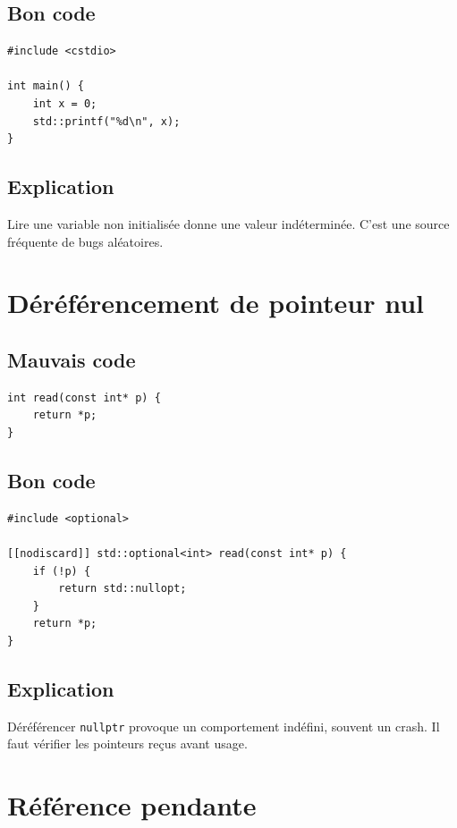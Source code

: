 \documentclass[a4paper,11pt]{report}
\begin{document}
\section{Bon code}
\begin{lstlisting}
#include <cstdio>

int main() {
    int x = 0;
    std::printf("%d\n", x);
}
\end{lstlisting}

\section{Explication}
Lire une variable non initialisée donne une valeur indéterminée.
C'est une source fréquente de bugs aléatoires.

\chapter{Déréférencement de pointeur nul}

\section{Mauvais code}
\begin{lstlisting}
int read(const int* p) {
    return *p;
}
\end{lstlisting}

\section{Bon code}
\begin{lstlisting}
#include <optional>

[[nodiscard]] std::optional<int> read(const int* p) {
    if (!p) {
        return std::nullopt;
    }
    return *p;
}
\end{lstlisting}

\section{Explication}
Déréférencer \texttt{nullptr} provoque un comportement indéfini, souvent un crash.
Il faut vérifier les pointeurs reçus avant usage.

\chapter{Référence pendante}
\end{document}
